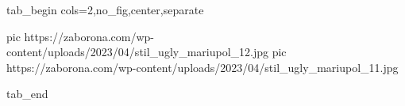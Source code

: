  
 
 
 
 


\ifcmt
  tab_begin cols=2,no_fig,center,separate

     pic https://zaborona.com/wp-content/uploads/2023/04/stil_ugly_mariupol_12.jpg
     pic https://zaborona.com/wp-content/uploads/2023/04/stil_ugly_mariupol_11.jpg

  tab_end
\fi
